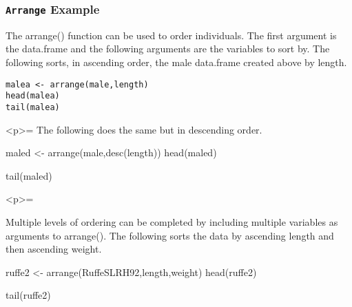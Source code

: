 
\frametitle{\texttt{Arrange} Example}
The arrange() function can be used to order individuals. The first argument is the data.frame and the following arguments are the variables to sort by. The following sorts, in ascending order, the male data.frame created above by length.

\begin{verbatim}
malea <- arrange(male,length)
head(malea)
tail(malea)
\end{verbatim}


<p>=
The following does the same but in descending order.


maled <- arrange(male,desc(length))
head(maled)

tail(maled)

<p>=

Multiple levels of ordering can be completed by including multiple variables as arguments to arrange(). The following sorts the data by ascending length and then ascending weight.


ruffe2 <- arrange(RuffeSLRH92,length,weight)
head(ruffe2)

tail(ruffe2)
